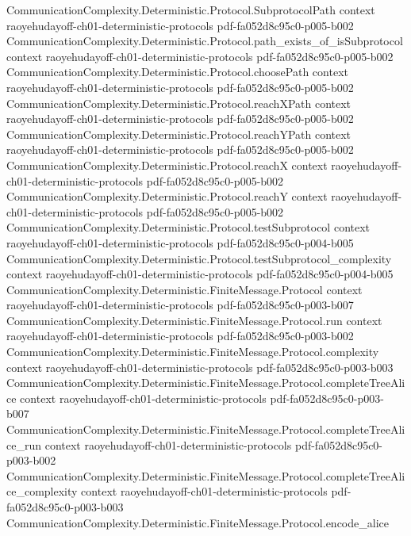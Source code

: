\begin{theorem}
\proofstep
  {CommunicationComplexity.Deterministic.Protocol.SubprotocolPath}
  {context}
  {raoyehudayoff-ch01-deterministic-protocols}
  {pdf-fa052d8c95c0-p005-b002}
\proofstep
  {CommunicationComplexity.Deterministic.Protocol.path_exists_of_isSubprotocol}
  {context}
  {raoyehudayoff-ch01-deterministic-protocols}
  {pdf-fa052d8c95c0-p005-b002}
\proofstep
  {CommunicationComplexity.Deterministic.Protocol.choosePath}
  {context}
  {raoyehudayoff-ch01-deterministic-protocols}
  {pdf-fa052d8c95c0-p005-b002}
\proofstep
  {CommunicationComplexity.Deterministic.Protocol.reachXPath}
  {context}
  {raoyehudayoff-ch01-deterministic-protocols}
  {pdf-fa052d8c95c0-p005-b002}
\proofstep
  {CommunicationComplexity.Deterministic.Protocol.reachYPath}
  {context}
  {raoyehudayoff-ch01-deterministic-protocols}
  {pdf-fa052d8c95c0-p005-b002}
\proofstep
  {CommunicationComplexity.Deterministic.Protocol.reachX}
  {context}
  {raoyehudayoff-ch01-deterministic-protocols}
  {pdf-fa052d8c95c0-p005-b002}
\proofstep
  {CommunicationComplexity.Deterministic.Protocol.reachY}
  {context}
  {raoyehudayoff-ch01-deterministic-protocols}
  {pdf-fa052d8c95c0-p005-b002}
\proofstep
  {CommunicationComplexity.Deterministic.Protocol.testSubprotocol}
  {context}
  {raoyehudayoff-ch01-deterministic-protocols}
  {pdf-fa052d8c95c0-p004-b005}
\proofstep
  {CommunicationComplexity.Deterministic.Protocol.testSubprotocol_complexity}
  {context}
  {raoyehudayoff-ch01-deterministic-protocols}
  {pdf-fa052d8c95c0-p004-b005}
\proofstep
  {CommunicationComplexity.Deterministic.FiniteMessage.Protocol}
  {context}
  {raoyehudayoff-ch01-deterministic-protocols}
  {pdf-fa052d8c95c0-p003-b007}
\proofstep
  {CommunicationComplexity.Deterministic.FiniteMessage.Protocol.run}
  {context}
  {raoyehudayoff-ch01-deterministic-protocols}
  {pdf-fa052d8c95c0-p003-b002}
\proofstep
  {CommunicationComplexity.Deterministic.FiniteMessage.Protocol.complexity}
  {context}
  {raoyehudayoff-ch01-deterministic-protocols}
  {pdf-fa052d8c95c0-p003-b003}
\proofstep
  {CommunicationComplexity.Deterministic.FiniteMessage.Protocol.completeTreeAlice}
  {context}
  {raoyehudayoff-ch01-deterministic-protocols}
  {pdf-fa052d8c95c0-p003-b007}
\proofstep
  {CommunicationComplexity.Deterministic.FiniteMessage.Protocol.completeTreeAlice_run}
  {context}
  {raoyehudayoff-ch01-deterministic-protocols}
  {pdf-fa052d8c95c0-p003-b002}
\proofstep
  {CommunicationComplexity.Deterministic.FiniteMessage.Protocol.completeTreeAlice_complexity}
  {context}
  {raoyehudayoff-ch01-deterministic-protocols}
  {pdf-fa052d8c95c0-p003-b003}
\proofstep
  {CommunicationComplexity.Deterministic.FiniteMessage.Protocol.encode_alice}

\end{theorem}
